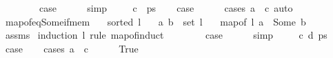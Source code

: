 \begin{isabellebody}
\ \ \isamarkupfalse%
\ {}\isanewline
\ \ \isamarkupfalse%
\ {\isacharquery}{\kern0pt}case\isanewline
\ \ \ \ \isamarkupfalse%
\ simp\isanewline
{}\isamarkupfalse%
\isanewline
\ \ \isamarkupfalse%
\ {\isacharparenleft}{\kern0pt}{}\ c\ {\isacharunderscore}{\kern0pt}\ ps{\isacharparenright}{\kern0pt}\isanewline
\ \ \isamarkupfalse%
\ {\isacharquery}{\kern0pt}case\isanewline
\ \ \ \ \isamarkupfalse%
\ {\isacharparenleft}{\kern0pt}cases\ {\isachardoublequoteopen}a\ {\isacharequal}{\kern0pt}\ c{\isachardoublequoteclose}{\isacharparenright}{\kern0pt}\ auto\isanewline
{}\isamarkupfalse%
%
\endisatagproof
{\isafoldproof}%
%
\isadelimproof
\isanewline
%
\endisadelimproof
\isanewline
{}\isamarkupfalse%
\ map{\isacharunderscore}{\kern0pt}of{\isacharunderscore}{\kern0pt}eq{\isacharunderscore}{\kern0pt}Some{\isacharunderscore}{\kern0pt}if{\isacharunderscore}{\kern0pt}mem{\isacharcolon}{\kern0pt}\isanewline
\ \ \ {\isachardoublequoteopen}sorted{}\ l{\isachardoublequoteclose}\isanewline
\ \ \ {\isachardoublequoteopen}{\isacharparenleft}{\kern0pt}a{\isacharcomma}{\kern0pt}\ b{\isacharparenright}{\kern0pt}\ {\isasymin}\ set\ l{\isachardoublequoteclose}\isanewline
\ \ \ {\isachardoublequoteopen}map{\isacharunderscore}{\kern0pt}of\ l\ a\ {\isacharequal}{\kern0pt}\ Some\ b{\isachardoublequoteclose}\isanewline
%
\isadelimproof
\ \ %
\endisadelimproof
%
\isatagproof
{}\isamarkupfalse%
\ assms\isanewline
{}\isamarkupfalse%
\ {\isacharparenleft}{\kern0pt}induction\ l\ rule{\isacharcolon}{\kern0pt}\ map{\isacharunderscore}{\kern0pt}of{\isachardot}{\kern0pt}induct{\isacharparenright}{\kern0pt}\isanewline
\ \ \isamarkupfalse%
\ {}\isanewline
\ \ \isamarkupfalse%
\ {\isacharquery}{\kern0pt}case\isanewline
\ \ \ \ \isamarkupfalse%
\ simp\isanewline
{}\isamarkupfalse%
\isanewline
\ \ \isamarkupfalse%
\ {\isacharparenleft}{\kern0pt}{}\ c\ d\ ps{\isacharparenright}{\kern0pt}\isanewline
\ \ \isamarkupfalse%
\ {\isacharquery}{\kern0pt}case\isanewline
\ \ \isamarkupfalse%
\ {\isacharparenleft}{\kern0pt}cases\ {\isachardoublequoteopen}a\ {\isacharequal}{\kern0pt}\ c{\isachardoublequoteclose}{\isacharparenright}{\kern0pt}\isanewline
\ \ \ \ \isamarkupfalse%
\ True\isanewline

\end{isabellebody}

